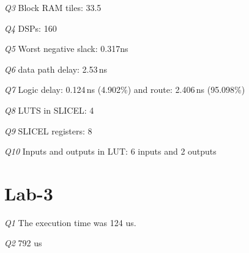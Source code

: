 \documentclass{article}
\begin{document}
\emph{Q3} Block RAM tiles: 33.5

\emph{Q4} DSPs: 160

\emph{Q5} Worst negative slack: 0.317ns

\emph{Q6} data path delay: 2.53\,ns 

\emph{Q7} Logic delay: 0.124\,ns (4.902\%) and route: 2.406\,ns (95.098\%)

\emph{Q8} LUTS in SLICEL: 4

\emph{Q9} SLICEL registers: 8

\emph{Q10} Inputs and outputs in LUT: 6 inputs and 2 outputs 

\newpage

\section{Lab-3}

\emph{Q1} The execution time was 124 us.

\emph{Q2} 792 us
\end{document}
